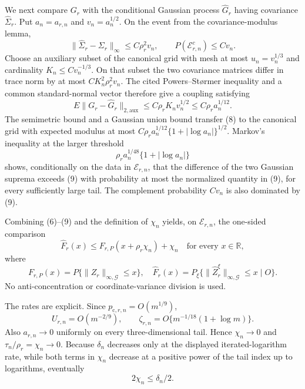 We next compare \(G_r\) with the conditional Gaussian process \(\widehat G_r\) having covariance \(\widehat\Sigma_r\). Put \(a_n=a_{r,n}\) and \(v_n=a_n^{1/2}\). On the event from the covariance-modulus lemma,
\[
 \|\widehat\Sigma_r-\Sigma_r\|_\infty
 \le C\rho_r^2v_n,\qquad
 P(\mathcal E_{r,n}^c)\le Cv_n.                           \tag{7}
\]
Choose an auxiliary subset of the canonical grid with mesh at most \(u_n=v_n^{1/3}\) and cardinality \(K_n\le Cv_n^{-1/3}\). On that subset the two covariance matrices differ in trace norm by at most \(CK_n^2\rho_r^2v_n\). The cited Powers--St{\o}rmer inequality and a common standard-normal vector therefore give a coupling satisfying
\[
 E\|G_r-\widehat G_r\|_{2,\mathrm{aux}}
 \le C\rho_rK_nv_n^{1/2}\le C\rho_r a_n^{1/12}.          \tag{8}
\]
The semimetric bound and a Gaussian union bound transfer (8) to the canonical grid with expected modulus at most
\(C\rho_r a_n^{1/12}\{1+|\log a_n|\}^{1/2}\). Markov's inequality at the larger threshold
\[
 \rho_r a_n^{1/48}\{1+|\log a_n|\}                      \tag{9}
\]
shows, conditionally on the data in \(\mathcal E_{r,n}\), that the difference of the two Gaussian suprema exceeds (9) with probability at most the normalized quantity in (9), for every sufficiently large tail. The complement probability \(Cv_n\) is also dominated by (9).

Combining (6)--(9) and the definition of \(\chi_n\) yields, on \(\mathcal E_{r,n}\), the one-sided comparison
\[
 \widehat F_r(x)
 \le F_{r,P}(x+\rho_r\chi_n)+\chi_n
 \quad\text{for every }x\in\mathbb R,                    \tag{10}
\]
where
\[
 F_{r,P}(x)=P\{\|Z_r\|_{\infty,\mathcal G}\le x\},
 \quad
 \widehat F_r(x)=P_\xi\{\|\widehat Z_r^\xi\|_{\infty,\mathcal G}\le x\mid O\}.
\]
No anti-concentration or coordinate-variance division is used.

The rates are explicit. Since \(p_{\mathrm c,r,n}=O(m^{1/9})\),
\[
 U_{r,n}=O(m^{-2/9}),\qquad
 \zeta_{r,n}=O\{m^{-1/18}(1+\log m)\}.                   \tag{11}
\]
Also \(a_{r,n}\to0\) uniformly on every three-dimensional tail. Hence \(\chi_n\to0\) and \(\tau_n/\rho_r=\chi_n\to0\). Because \(\delta_n\) decreases only at the displayed iterated-logarithm rate, while both terms in \(\chi_n\) decrease at a positive power of the tail index up to logarithms, eventually
\[
 2\chi_n\le\delta_n/2.                                    \tag{12}
\]

